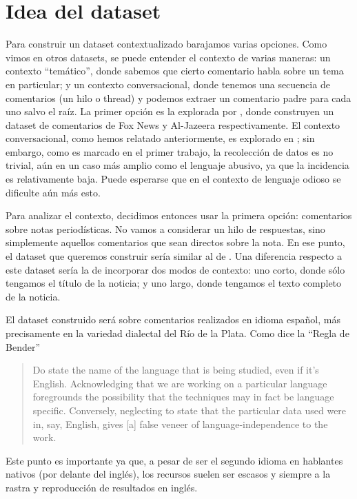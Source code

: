 \section{Idea del dataset}

Para construir un dataset contextualizado barajamos varias opciones. Como vimos en otros datasets, se puede entender el contexto de varias maneras: un contexto ``temático'', donde sabemos que cierto comentario habla sobre un tema en particular; y un contexto conversacional, donde tenemos una secuencia de comentarios (un hilo o thread) y podemos extraer un comentario padre para cada uno salvo el raíz. La primer opción es la explorada por \cite{gao-huang-2017-detecting,mubarak-etal-2017-abusive}, donde construyen un dataset de comentarios de Fox News y Al-Jazeera respectivamente. El contexto conversacional, como hemos relatado anteriormente, es explorado en \citet{pavlopoulos2020toxicity,xenos-2021-context}; sin embargo, como es marcado en el primer trabajo, la recolección de datos es no trivial, aún en un caso más amplio como el lenguaje abusivo, ya que la incidencia es relativamente baja. Puede esperarse que en el contexto de lenguaje odioso se dificulte aún más esto.

Para analizar el contexto, decidimos entonces usar la primera opción: comentarios sobre notas periodísticas. No vamos a considerar un hilo de respuestas, sino simplemente aquellos comentarios que sean directos sobre la nota. En ese punto, el dataset que queremos construir sería similar al de \cite{gao-huang-2017-detecting}. Una diferencia respecto a este dataset sería la de incorporar dos modos de contexto: uno corto, donde sólo tengamos el título de la noticia; y uno largo, donde tengamos el texto completo de la noticia.

El dataset construido será sobre comentarios realizados en idioma español, más precisamente en la variedad dialectal del Río de la Plata. Como dice la ``Regla de Bender''\cite{bender2011achieving}

\begin{quote}
    Do state the name of the language that is being studied, even if it's English. Acknowledging that we are working on a particular language foregrounds the possibility that the techniques may in fact be language specific. Conversely, neglecting to state that the particular data used were in, say, English, gives [a] false veneer of language-independence to the work.
\end{quote}

Este punto es importante ya que, a pesar de ser el segundo idioma en hablantes nativos (por delante del inglés), los recursos suelen ser escasos y siempre a la rastra y reproducción de resultados en inglés. 

